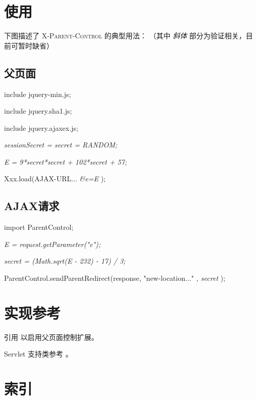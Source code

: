 \documentclass[hyperref, bookmark]{article}
\newcommand*\xpc{ \textsc{X-Parent-Control} }
\newcommand\ol[1]{\begin{enumerate}{#1}\end{enumerate}}
\begin{document}
\section {使用}

    下图描述了 \xpc 的典型用法：
    （其中 \textsl{ 斜体 } 部分为验证相关，目前可暂时缺省）

    \subsection {父页面}

        \ol{
            \item include jquery-min.js;
            \item include jquery.sha1.js;
            \item include jquery.ajaxex.js;
            \item \textsl{ sessionSecret = secret = RANDOM; }
            \item \textsl{ E = 9*secret*secret + 102*secret + 57; }
            \item Xxx.load(AJAX-URL... \textsl{\&e=E} );
        }

    \subsection {AJAX请求}

        \ol{
            \item import ParentControl;
            \item \textsl{ E = request.getParameter("e"); }
            \item \textsl{ secret = (Math.sqrt(E - 232) - 17) / 3; }
            \item ParentControl.sendParentRedirect(response, "new-location..."
                    \textsl{, secret} );
        }

\appendix
\section {实现参考}

     引用 \cite{jq.ajaxex} 以启用父页面控制扩展。

    Servlet 支持类参考 \cite{ebcdev.xpc}。

    
    

\section {索引}

    \listoftables
\end{document}
